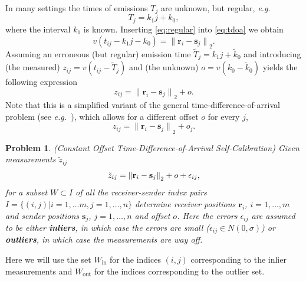 \documentclass[
]{book}
\providecommand{\norm}[1]{\lVert#1\rVert}
\newtheorem{problem1}{\noindent \textbf{Problem}}
\def\eg{\emph{e.g.\ }}
\def\Win{W_{\text{in}}}
\def\Wout{W_{\text{out}}}
\begin{document}
In many settings the times of emissions \(T_j\) are unknown, but regular, \eg
\begin{equation}
T_j = k_1 j + k_0, 
\label{eq:regular}
\end{equation}
where the interval \(k_1\) is known. Inserting \eqref{eq:regular} into \eqref{eq:tdoa} we
obtain
\begin{equation}
v (t_{ij}-k_1 j - k_0)   = {\norm{\mathbf{r}_i - \mathbf{s}_j}}_2 . 
\end{equation}
Assuming an erroneous (but regular) emission time
\(\tilde{T}_j = k_1 j + \tilde{k}_0\) and
introducing (the measured) \(z_{ij} = v (t_{ij}-\tilde{T}_j)\) and (the unknown) \(o = v (k_0-\tilde{k}_0)\) yields the following expression
\begin{equation}
 z_{ij}   = {\norm{\mathbf{r}_i - \mathbf{s}_j}}_2 + o. 
\end{equation}
Note that this is a simplified variant of the general time-difference-of-arrival problem (see \eg  \cite{kuang2013stratified}), which allows for a different offset \(o\) for every \(j\),
\begin{equation}
 z_{ij}   = {\norm{\mathbf{r}_i - \mathbf{s}_j}}_2 + o_j.
\end{equation}

\noindent 

\begin{problem1} \label{prob_misstoa}
({{Constant Offset Time-Difference-of-Arrival  Self-Calibration}}) Given measurements $\tilde{z}_{ij}$ 
\vspace{-5pt}
\begin{equation}
\tilde{z}_{ij} = {\norm{\mathbf{r}_i - \mathbf{s}_j}}_2 + o  + \epsilon_{ij}, 
\label{eq:distance}
\vspace{-5pt}
\end{equation}
for a subset $W \subset I$ of all the receiver-sender index pairs $I = \{ (i,j) | i = 1, \ldots m, j = 1, \ldots, n \}$ determine receiver positions $\mathbf{r}_i$, $ i = 1, \dots, m$ and sender positions $\mathbf{s}_j$,  $j = 1, \dots, n$ and offset $o$. 
Here the errors $\epsilon_{ij}$ are assumed to be either 
{\bf inliers}, in which case the errors are small ($\epsilon_{ij} \in N(0,\sigma)$) or {\bf outliers}, in which case the measurements are way off. 
\end{problem1}

Here we will use the set \(\Win\) for the indices \((i,j)\) corresponding to the inlier measurements and \(\Wout\) for the indices corresponding to the outlier set.
\vspace{-5pt}
\end{document}
